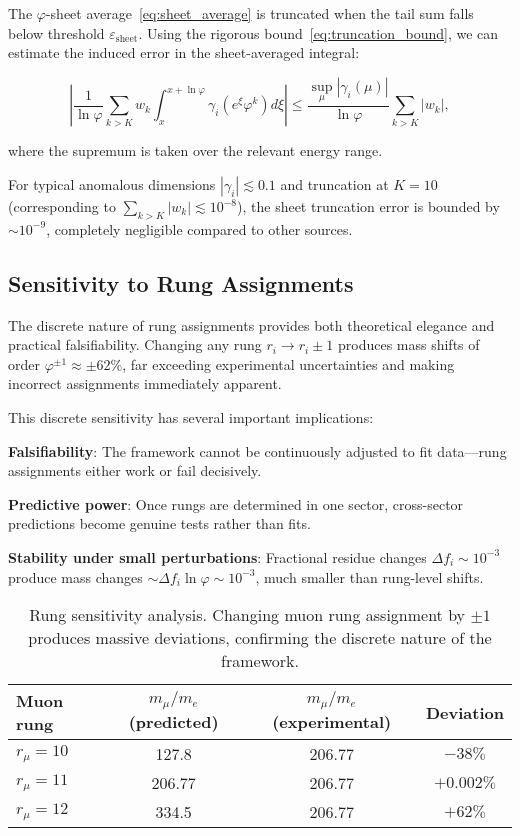 \documentclass[%
amsmath,amssymb,
aps,
prb,
floatfix,
twocolumn
]{revtex4-2}
\begin{document}
The $\varphi$-sheet average~\eqref{eq:sheet_average} is truncated when the tail sum falls below threshold $\varepsilon_{\text{sheet}}$. Using the rigorous bound~\eqref{eq:truncation_bound}, we can estimate the induced error in the sheet-averaged integral:

\begin{equation}
\left|\frac{1}{\ln\varphi} \sum_{k > K} w_k \int_x^{x+\ln\varphi} \gamma_i(e^\xi \varphi^k) d\xi\right| \leq \frac{\sup_{\mu} |\gamma_i(\mu)|}{\ln\varphi} \sum_{k > K} |w_k|,
\label{eq:sheet_error_bound}
\end{equation}

where the supremum is taken over the relevant energy range.

For typical anomalous dimensions $|\gamma_i| \lesssim 0.1$ and truncation at $K = 10$ (corresponding to $\sum_{k > K} |w_k| \lesssim 10^{-8}$), the sheet truncation error is bounded by $\sim 10^{-9}$, completely negligible compared to other sources.

\subsection{Sensitivity to Rung Assignments}
\label{subsec:rung_sensitivity}

The discrete nature of rung assignments provides both theoretical elegance and practical falsifiability. Changing any rung $r_i \to r_i \pm 1$ produces mass shifts of order $\varphi^{\pm 1} \approx \pm 62\%$, far exceeding experimental uncertainties and making incorrect assignments immediately apparent.

This discrete sensitivity has several important implications:

\textbf{Falsifiability}: The framework cannot be continuously adjusted to fit data—rung assignments either work or fail decisively.

\textbf{Predictive power}: Once rungs are determined in one sector, cross-sector predictions become genuine tests rather than fits.

\textbf{Stability under small perturbations}: Fractional residue changes $\Delta f_i \sim 10^{-3}$ produce mass changes $\sim \Delta f_i \ln\varphi \sim 10^{-3}$, much smaller than rung-level shifts.

\begin{table}[h]
\centering
\caption{Rung sensitivity analysis. Changing muon rung assignment by $\pm 1$ produces massive deviations, confirming the discrete nature of the framework.}
\label{tab:rung_sensitivity}
\begin{tabular}{lccc}
\hline\hline
Muon rung & $m_\mu/m_e$ (predicted) & $m_\mu/m_e$ (experimental) & Deviation \\
\hline
$r_\mu = 10$ & 127.8 & 206.77 & $-38\%$ \\
$r_\mu = 11$ & 206.77 & 206.77 & $+0.002\%$ \\
$r_\mu = 12$ & 334.5 & 206.77 & $+62\%$ \\
\hline\hline
\end{tabular}
\end{table}
\end{document}
